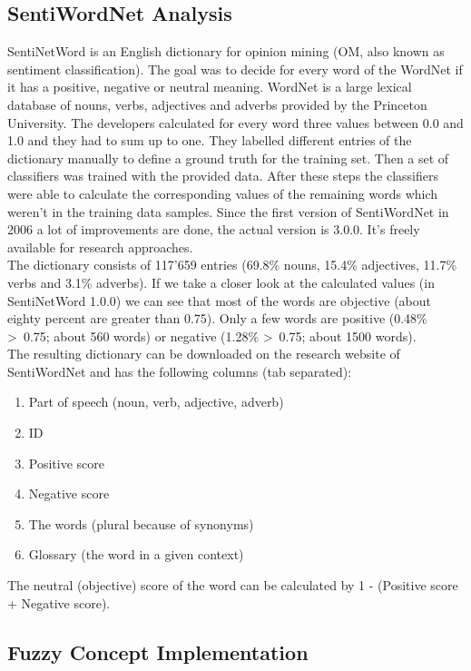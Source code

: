 \documentclass[a4paper]{article}
\begin{document}
\subsection{SentiWordNet Analysis}
SentiNetWord is an English dictionary for opinion mining (OM, also known as sentiment classification). The goal was to decide for every word of the WordNet if it has a positive, negative or neutral meaning. WordNet is a large lexical database of nouns, verbs, adjectives and adverbs provided by the Princeton University. The developers calculated for every word three values between 0.0 and 1.0 and they had to sum up to one. They labelled different entries of the dictionary manually to define a ground truth for the training set. Then a set of classifiers was trained with the provided data. After these steps the classifiers were able to calculate the corresponding values of the remaining words which weren't in the training data samples. Since the first version of SentiWordNet in 2006 a lot of improvements are done, the actual version is 3.0.0. It's freely available for research approaches.\\
The dictionary consists of 117'659 entries (69.8\% nouns, 15.4\% adjectives, 11.7\% verbs and 3.1\% adverbs). If we take a closer look at the calculated values (in SentiNetWord 1.0.0) we can see that most of the words are objective (about eighty percent are greater than 0.75). Only a few words are positive (0.48\% \textgreater \ 0.75; about 560 words) or negative (1.28\% \textgreater \ 0.75; about 1500 words).\\
The resulting dictionary can be downloaded on the research website of SentiWordNet and has the following columns (tab separated):
\begin{enumerate}
	\item Part of speech (noun, verb, adjective, adverb)
  \item ID
	\item Positive score
	\item Negative score
	\item The words (plural because of synonyms)
	\item Glossary (the word in a given context)
\end{enumerate}
The neutral (objective) score of the word can be calculated by 1 - (Positive score + Negative score).

\subsection{Fuzzy Concept Implementation}
\end{document}
